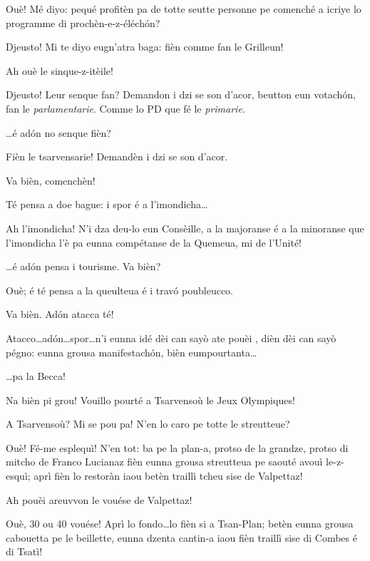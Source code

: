 \begin{drama}
\Laurentspeaks Ouè! Mé diyo: pequé profitèn pa de totte seutte personne pe comenché a icriye lo programme di prochèn-e-z-éléchón?

\Ronnyspeaks Djeusto! Mi te diyo eugn'atra baga: fièn comme fan le Grilleun!

\Laurentspeaks Ah ouè le sinque-z-itèile!

\Ronnyspeaks Djeusto! Leur senque fan? Demandon i dzi se son d’acor, beutton eun votach\'on, fan le \textit{parlamentarie}. Comme lo PD que fé le \textit{primarie}.

\Laurentspeaks \ldots é ad\'on no senque fièn?

\Ronnyspeaks Fièn le tsarvensarie! Demandèn i dzi se son d’acor.

\Laurentspeaks Va bièn, comenchèn!

\Ronnyspeaks Té pensa a doe bague: i spor é a l'imondicha\ldots

\Laurentspeaks Ah l'imondicha! N'i dza deu-lo eun Consèille, a la majoranse é a la minoranse que l'imondicha l'è pa eunna compétanse de la Quemeua, mi de l'Unité!

\Ronnyspeaks \ldots é ad\'on pensa i tourisme. Va bièn?

\Laurentspeaks Ouè; é té pensa a la queulteua é i travó poubleucco.

\Ronnyspeaks Va bièn. Ad\'on atacca té!

\Laurentspeaks Atacco\ldots ad\'on\ldots spor\ldots n'i eunna idé dèi can sayò ate pouèi , dièn dèi can sayò pégno: eunna grousa manifestach\'on, bièn eumpourtanta\ldots

\Ronnyspeaks \ldots pa la Becca!

\Laurentspeaks Na bièn pi grou! Vouillo pourté a Tsarvensoù le Jeux Olympiques!

\Ronnyspeaks A Tsarvensoù? Mi se pou pa! N'en lo caro pe totte le streutteue?

\Laurentspeaks Ouè! Fé-me esplequì! N'en tot: ba pe la plan-a, protso de la grandze, protso di mitcho de Franco Lucianaz fièn eunna grousa streutteua pe saouté avouì le-z-esquì; aprì fièn lo restoràn iaou betèn traillì tcheu sise de Valpettaz!

\Ronnyspeaks Ah pouèi areuvvon le vouése de Valpettaz!

\Laurentspeaks Ouè,  30 ou 40 vouése! Aprì lo fondo\ldots lo fièn si a Tsan-Plan; betèn eunna grousa cabouetta pe le beillette, eunna dzenta cantin-a iaou fièn traillì sise di Combes é di Tsatì!


\end{drama}
